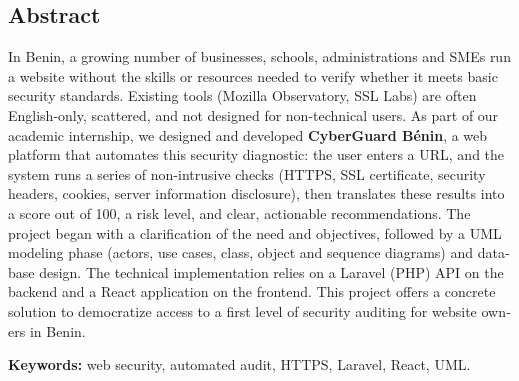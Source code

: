 \begin{otherlanguage}{english}
\chapter*{Abstract}

In Benin, a growing number of businesses, schools, administrations and SMEs run a
website without the skills or resources needed to verify whether it meets basic
security standards. Existing tools (Mozilla Observatory, SSL Labs) are often
English-only, scattered, and not designed for non-technical users. As part of our
academic internship, we designed and developed \textbf{CyberGuard B\'enin}, a web
platform that automates this security diagnostic: the user enters a URL, and the
system runs a series of non-intrusive checks (HTTPS, SSL certificate, security
headers, cookies, server information disclosure), then translates these results
into a score out of 100, a risk level, and clear, actionable recommendations. The
project began with a clarification of the need and objectives, followed by a UML
modeling phase (actors, use cases, class, object and sequence diagrams) and
database design. The technical implementation relies on a Laravel (PHP) API on
the backend and a React application on the frontend. This project offers a
concrete solution to democratize access to a first level of security auditing for
website owners in Benin.

\bigskip
\noindent\textbf{Keywords:} web security, automated audit, HTTPS, Laravel, React,
UML.
\end{otherlanguage}
